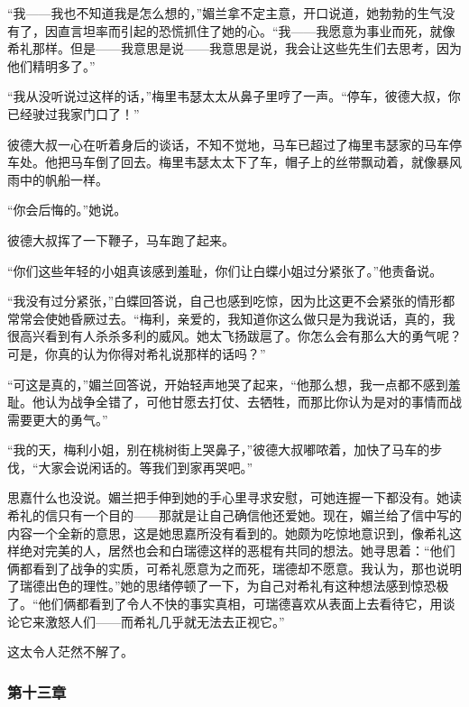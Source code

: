 \par “我——我也不知道我是怎么想的，”媚兰拿不定主意，开口说道，她勃勃的生气没有了，因直言坦率而引起的恐慌抓住了她的心。“我——我愿意为事业而死，就像希礼那样。但是——我意思是说——我意思是说，我会让这些先生们去思考，因为他们精明多了。”
\par “我从没听说过这样的话，”梅里韦瑟太太从鼻子里哼了一声。“停车，彼德大叔，你已经驶过我家门口了！”
\par 彼德大叔一心在听着身后的谈话，不知不觉地，马车已超过了梅里韦瑟家的马车停车处。他把马车倒了回去。梅里韦瑟太太下了车，帽子上的丝带飘动着，就像暴风雨中的帆船一样。
\par “你会后悔的。”她说。
\par 彼德大叔挥了一下鞭子，马车跑了起来。
\par “你们这些年轻的小姐真该感到羞耻，你们让白蝶小姐过分紧张了。”他责备说。
\par “我没有过分紧张，”白蝶回答说，自己也感到吃惊，因为比这更不会紧张的情形都常常会使她昏厥过去。“梅利，亲爱的，我知道你这么做只是为我说话，真的，我很高兴看到有人杀杀多利的威风。她太飞扬跋扈了。你怎么会有那么大的勇气呢？可是，你真的认为你得对希礼说那样的话吗？”
\par “可这是真的，”媚兰回答说，开始轻声地哭了起来，“他那么想，我一点都不感到羞耻。他认为战争全错了，可他甘愿去打仗、去牺牲，而那比你认为是对的事情而战需要更大的勇气。”
\par “我的天，梅利小姐，别在桃树街上哭鼻子，”彼德大叔嘟哝着，加快了马车的步伐，“大家会说闲话的。等我们到家再哭吧。”
\par 思嘉什么也没说。媚兰把手伸到她的手心里寻求安慰，可她连握一下都没有。她读希礼的信只有一个目的——那就是让自己确信他还爱她。现在，媚兰给了信中写的内容一个全新的意思，这是她思嘉所没有看到的。她颇为吃惊地意识到，像希礼这样绝对完美的人，居然也会和白瑞德这样的恶棍有共同的想法。她寻思着：“他们俩都看到了战争的实质，可希礼愿意为之而死，瑞德却不愿意。我认为，那也说明了瑞德出色的理性。”她的思绪停顿了一下，为自己对希礼有这种想法感到惊恐极了。“他们俩都看到了令人不快的事实真相，可瑞德喜欢从表面上去看待它，用谈论它来激怒人们——而希礼几乎就无法去正视它。”
\par 这太令人茫然不解了。

\subsubsection{第十三章}

